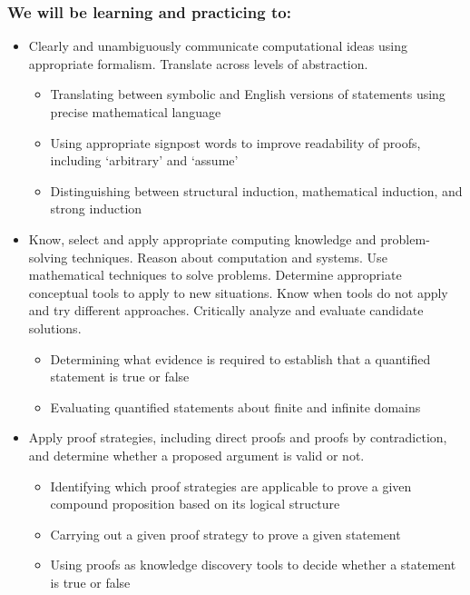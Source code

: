 \subsubsection*{We will be learning and practicing to:}
\begin{itemize}

\item Clearly and unambiguously communicate computational ideas using appropriate formalism. Translate across levels of abstraction.
\begin{itemize}
   \item Translating between symbolic and English versions of statements using precise mathematical language
    \item Using appropriate signpost words to improve readability of proofs, including `arbitrary' and `assume'
    \item Distinguishing between structural induction, mathematical induction, and strong induction
\end{itemize}

\item Know, select and apply appropriate computing knowledge and problem-solving techniques. Reason about computation and systems. Use mathematical techniques to solve problems. Determine appropriate conceptual tools to apply to new situations. Know when tools do not apply and try different approaches. Critically analyze and evaluate candidate solutions.
\begin{itemize}
    \item Determining what evidence is required to establish that a quantified statement is true or false
    \item Evaluating quantified statements about finite and infinite domains
\end{itemize}

\item Apply proof strategies, including direct proofs and proofs by contradiction, and determine whether a proposed argument is valid or not.
\begin{itemize}
    \item Identifying which proof strategies are applicable to prove a given compound proposition based on its logical structure
    \item Carrying out a given proof strategy to prove a given statement
    \item Using proofs as knowledge discovery tools to decide whether a statement is true or false
\end{itemize}


\end{itemize}
